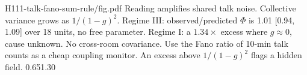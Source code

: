 {H111-talk-fano-sum-rule/fig.pdf}
{Reading amplifies shared talk noise. Collective variance grows as $1/(1-g)^2$.}
{Regime III: observed/predicted $\Phi$ is 1.01 [0.94, 1.09] over 18 units, no free parameter. Regime I: a $1.34\times$ excess where $g\approx0$, cause unknown. No cross-room covariance.}
{Use the Fano ratio of 10-min talk counts as a cheap coupling monitor. An excess above $1/(1-g)^2$ flags a hidden field.}
{0.65}{1.30}
